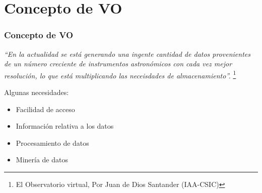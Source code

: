 \section{Concepto de VO}
\begin{frame}
\frametitle{Concepto de VO}
\emph{``En la actualidad se está generando una ingente cantidad de datos
provenientes de un número creciente de instrumentos astronómicos con cada vez
mejor resolución, lo que está multiplicando las neceisdades de almacenamiento''.}
\footnote{El Observatorio virtual, Por Juan de Dios Santander (IAA-CSIC)}


Algunas necesidades:
\newline
\begin{itemize}%
	\transdissolve
	\setlength{\itemindent}{1.0cm}
	\item <2->Facilidad de acceso
	\item <3->Información relativa a los datos
	\item <4->Procesamiento de datos
	\item <5->Minería de datos
\end{itemize}

\end{frame}

